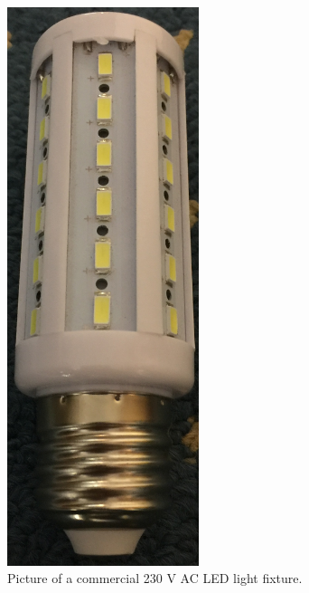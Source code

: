 \begin{figure}
\begin{minipage}[b]{0.45\textwidth}
			\includegraphics[angle=0,width=0.5\textwidth]{chapters/hardware-chapters/AC/ac-modulator/commercial-230v-ac-led/commercial-ac-led-picture.jpg}
			\caption{Picture of a commercial 230 V AC LED light fixture.}
			\label{fig:ac-commercial-230v-ac-led}
		\end{minipage}
	\end{figure}





















